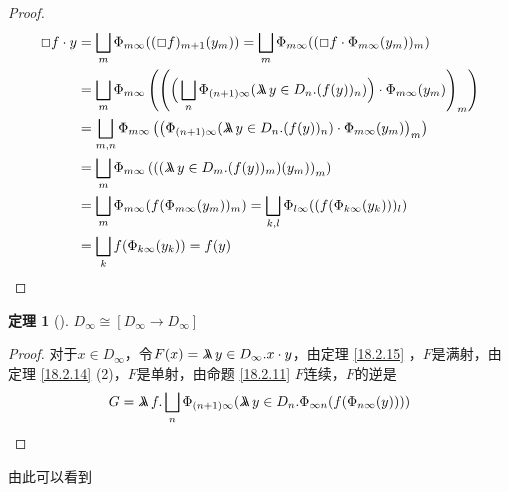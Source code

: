 \documentclass{jams-l}
\newtheorem{theorem}{定理}[section]
\begin{document}
\begin{proof}
\begin{align*}
\Box f\cdot y&=\bigsqcup_m\Phi_{m\infty}((\Box f)_{m+1}(y_m))=\bigsqcup_m\Phi_{m\infty}((\Box f\cdot\Phi_{m\infty}(y_m))_m)\\
&=\bigsqcup_m\Phi_{m\infty}\left( \left(
\Big(\bigsqcup_n\Phi_{(n+1)\infty}(
\metalambda y\in D_n.(f(y))_n)\Big)\cdot\Phi_{m\infty}(y_m)  \right)_m \right)\\
&=\bigsqcup_{m,n}\Phi_{m\infty}\left(
\left(
\Phi_{(n+1)\infty}(\metalambda y\in D_n.(f(y))_n)\cdot\Phi_{m\infty}(y_m)  \right)_m \right)\\
&=\bigsqcup_m\Phi_{m\infty}\left( \left(
(\metalambda y\in D_m.(f(y))_m)(y_m)  \right)_m \right)\\
&=\bigsqcup_m\Phi_{m\infty}(f(\Phi_{m\infty}(y_m))_m)=\bigsqcup_{k,l}\Phi_{l\infty}((f(\Phi_{k\infty}(y_k)))_l)\\
&=\bigsqcup_k f(\Phi_{k\infty}(y_k))=f(y)
\end{align*}
\end{proof}

\begin{theorem}[]
\(D_\infty\cong[D_\infty\to D_\infty]\)
\end{theorem}

\begin{proof}
对于\(x\in D_\infty\)，令\(F(x)=\metalambda y\in D_\infty.x\cdot y\)，由定理 \ref{18.2.15} ，\(F\)是满射，由定理
\ref{18.2.14} (2)，\(F\)是单射，由命题 \ref{18.2.11} \(F\)连续，\(F\)的逆是
\begin{equation*}
G=\metalambda f.\bigsqcup_n\Phi_{(n+1)\infty}(\metalambda y\in D_n.\Phi_{\infty n}(f(\Phi_{n\infty}(y))))
\end{equation*}
\end{proof}

由此可以看到
\nocite{hindley2008lambda}
\nocite{zbMATH03877147}

\label{bibliographystyle link}


\label{bibliography link}

\end{document}
